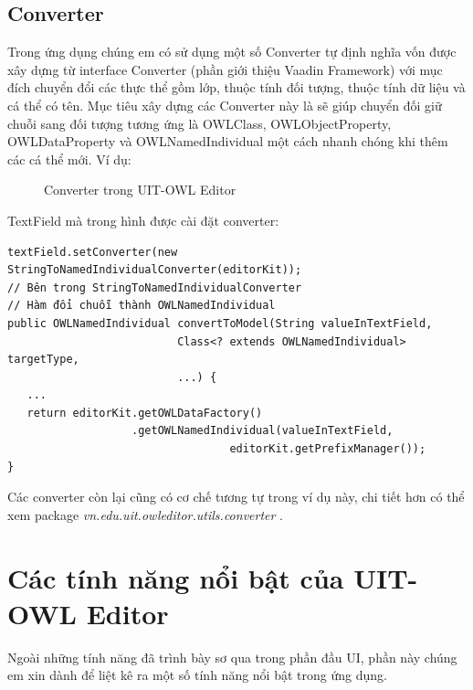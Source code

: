 \subsection{Converter}
Trong ứng dụng chúng em có sử dụng một số Converter tự định nghĩa vốn được xây dựng từ interface Converter (phần giới thiệu Vaadin Framework) với mục đích chuyển đổi các thực thể gồm lớp, thuộc tính đối tượng, thuộc tính dữ liệu và cá thể có tên. Mục tiêu xây dựng các Converter này là sẽ giúp chuyển đối giữ chuỗi sang đối tượng tương ứng là OWLClass, OWLObjectProperty, OWLDataProperty và OWLNamedIndividual một cách nhanh chóng khi thêm các cá thể mới. Ví dụ:
\begin{figure}[h!]
	\centering
	\caption{Converter trong UIT-OWL Editor\label{overflow}}
\end{figure}
TextField mà trong hình được cài đặt converter:
\begin{verbatim}
textField.setConverter(new StringToNamedIndividualConverter(editorKit));
// Bên trong StringToNamedIndividualConverter 
// Hàm đổi chuỗi thành OWLNamedIndividual
public OWLNamedIndividual convertToModel(String valueInTextField,
                          Class<? extends OWLNamedIndividual> targetType,
                          ...) {
   ...
   return editorKit.getOWLDataFactory()
                   .getOWLNamedIndividual(valueInTextField,
                                  editorKit.getPrefixManager());
}                          
\end{verbatim}
Các converter còn lại cũng có cơ chế tương tự trong ví dụ này, chi tiết hơn có thể xem package \textit{vn.edu.uit.owleditor.utils.converter} \cite{owleditorSrc}.

\section{Các tính năng nổi bật của UIT-OWL Editor}
Ngoài những tính năng đã trình bày sơ qua trong phần đầu UI, phần này chúng em xin dành để liệt kê ra một số tính năng nổi bật trong ứng dụng.

